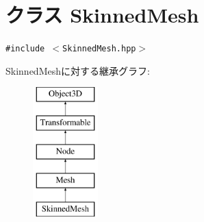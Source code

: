 \hypertarget{classm3g_1_1SkinnedMesh}{
\section{クラス SkinnedMesh}
\label{classm3g_1_1SkinnedMesh}
}
{\tt \#include $<$SkinnedMesh.hpp$>$}

SkinnedMeshに対する継承グラフ:\begin{figure}[H]
\begin{center}
\leavevmode
\includegraphics[height=5cm]{classm3g_1_1SkinnedMesh}
\end{center}
\end{figure}
